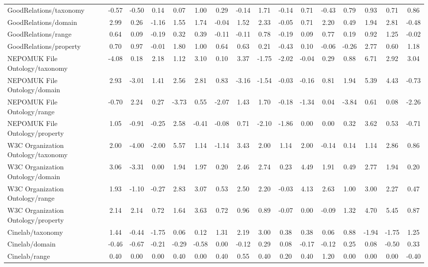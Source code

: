 \begin{tabular}{lccccccccccccccc}
GoodRelations/taxonomy & -0.57 & -0.50 & 0.14 & 0.07 & 1.00 & 0.29 & -0.14 & 1.71 & -0.14 & 0.71 & -0.43 & 0.79 & 0.93 & 0.71 & 0.86 \\
GoodRelations/domain & 2.99 & 0.26 & -1.16 & 1.55 & 1.74 & -0.04 & 1.52 & 2.33 & -0.05 & 0.71 & 2.20 & 0.49 & 1.94 & 2.81 & -0.48 \\
GoodRelations/range & 0.64 & 0.09 & -0.19 & 0.32 & 0.39 & -0.11 & -0.11 & 0.78 & -0.19 & 0.09 & 0.77 & 0.19 & 0.92 & 1.25 & -0.02 \\
GoodRelations/property & 0.70 & 0.97 & -0.01 & 1.80 & 1.00 & 0.64 & 0.63 & 0.21 & -0.43 & 0.10 & -0.06 & -0.26 & 2.77 & 0.60 & 1.18 \\
NEPOMUK File Ontology/taxonomy & -4.08 & 0.18 & 2.18 & 1.12 & 3.10 & 0.10 & 3.37 & -1.75 & -2.02 & -0.04 & 0.29 & 0.88 & 6.71 & 2.92 & 3.04 \\
NEPOMUK File Ontology/domain & 2.93 & -3.01 & 1.41 & 2.56 & 2.81 & 0.83 & -3.16 & -1.54 & -0.03 & -0.16 & 0.81 & 1.94 & 5.39 & 4.43 & -0.73 \\
NEPOMUK File Ontology/range & -0.70 & 2.24 & 0.27 & -3.73 & 0.55 & -2.07 & 1.43 & 1.70 & -0.18 & -1.34 & 0.04 & -3.84 & 0.61 & 0.08 & -2.26 \\
NEPOMUK File Ontology/property & 1.05 & -0.91 & -0.25 & 2.58 & -0.41 & -0.08 & 0.71 & -2.10 & -1.86 & 0.00 & 0.00 & 0.32 & 3.62 & 0.53 & -0.71 \\
W3C Organization Ontology/taxonomy & 2.00 & -4.00 & -2.00 & 5.57 & 1.14 & -1.14 & 3.43 & 2.00 & 1.14 & 2.00 & -0.14 & 0.14 & 1.14 & 2.86 & 0.86 \\
W3C Organization Ontology/domain & 3.06 & -3.31 & 0.00 & 1.94 & 1.97 & 0.20 & 2.46 & 2.74 & 0.23 & 4.49 & 1.91 & 0.49 & 2.77 & 1.94 & 0.20 \\
W3C Organization Ontology/range & 1.93 & -1.10 & -0.27 & 2.83 & 3.07 & 0.53 & 2.50 & 2.20 & -0.03 & 4.13 & 2.63 & 1.00 & 3.00 & 2.27 & 0.47 \\
W3C Organization Ontology/property & 2.14 & 2.14 & 0.72 & 1.64 & 3.63 & 0.72 & 0.96 & 0.89 & -0.07 & 0.00 & -0.09 & 1.32 & 4.70 & 5.45 & 0.87 \\
Cinelab/taxonomy & 1.44 & -0.44 & -1.75 & 0.06 & 0.12 & 1.31 & 2.19 & 3.00 & 0.38 & 0.38 & 0.06 & 0.88 & -1.94 & -1.75 & 1.25 \\
Cinelab/domain & -0.46 & -0.67 & -0.21 & -0.29 & -0.58 & 0.00 & -0.12 & 0.29 & 0.08 & -0.17 & -0.12 & 0.25 & 0.08 & -0.50 & 0.33 \\
Cinelab/range & 0.40 & 0.00 & 0.00 & 0.40 & 0.00 & 0.40 & 0.55 & 0.40 & 0.20 & 0.40 & 1.20 & 0.00 & 0.00 & 0.00 & -0.40 \\

\end{tabular}
